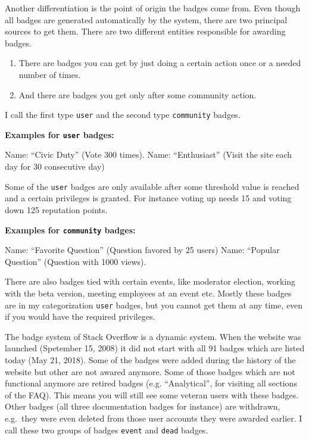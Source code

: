 \documentclass[]{book}
\providecommand{\tightlist}{%
  \setlength{\itemsep}{0pt}\setlength{\parskip}{0pt}}
\theoremstyle{definition}
\theoremstyle{definition}
\theoremstyle{definition}
\theoremstyle{remark}
\begin{document}
Another differentiation is the point of origin the badges come from.
Even though all badges are generated automatically by the system, there
are two principal sources to get them. There are two different entities
responsible for awarding badges.

\begin{enumerate}
\def\labelenumi{\arabic{enumi}.}
\tightlist
\item
  There are badges you can get by just doing a certain action once or a
  needed number of times.
\item
  And there are badges you get only after some community action.
\end{enumerate}

I call the first type \texttt{user} and the second type
\texttt{community} badges.

\textbf{Examples for \texttt{user} badges:}

Name: ``Civic Duty'' (Vote 300 times). Name: ``Enthusiast'' (Visit the
site each day for 30 consecutive day)

Some of the \texttt{user} badges are only available after some threshold
value is reached and a certain privileges is granted. For instance
voting up needs 15 and voting down 125 reputation points.

\textbf{Examples for \texttt{community} badges:}

Name: ``Favorite Question'' (Question favored by 25 users) Name:
``Popular Question'' (Question with 1000 views).

There are also badges tied with certain events, like moderator election,
working with the beta version, meeting employees at an event etc. Mostly
these badges are in my categorization \texttt{user} badges, but you
cannot get them at any time, even if you would have the required
privileges.

The badge system of Stack Overflow is a dynamic system. When the website
was launched (Spetember 15, 2008) it did not start with all 91 badges
which are listed today (May 21, 2018). Some of the badges were added
during the history of the website but other are not awared anymore. Some
of those badges which are not functional anymore are retired badges
(e.g. ``Analytical'', for visiting all sections of the FAQ). This means
you will still see some veteran users with these badges. Other badges
(all three documentation badges for instance) are withdrawn, e.g.~they
were even deleted from those user accounts they were awarded earlier. I
call these two groups of badges \texttt{event} and \texttt{dead} badges.
\end{document}
